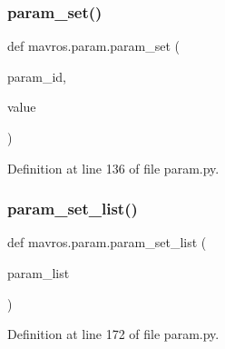 \subsubsection{\texorpdfstring{param\_set()}{param\_set()}}
{\footnotesize\ttfamily def mavros.\+param.\+param\+\_\+set (\begin{DoxyParamCaption}\item[{}]{param\+\_\+id,  }\item[{}]{value }\end{DoxyParamCaption})}



Definition at line 136 of file param.\+py.

\mbox{\label{namespacemavros_1_1param_a576f9e71fa66d8488b4c4f78554795b7}} 
\subsubsection{\texorpdfstring{param\_set\_list()}{param\_set\_list()}}
{\footnotesize\ttfamily def mavros.\+param.\+param\+\_\+set\+\_\+list (\begin{DoxyParamCaption}\item[{}]{param\+\_\+list }\end{DoxyParamCaption})}



Definition at line 172 of file param.\+py.

